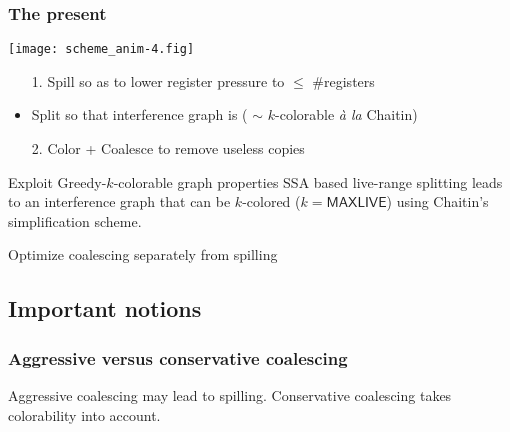\begin{frame}[label=past]
  \frametitle{The present}
\texttt{[image: scheme\_anim-4.fig]}
  \begin{itemize}
  \item[1.] \alert{Spill} so as to lower register pressure to $\leq$ \#registers
  \item \alert{Split} so that interference graph is  
    ( $\sim$ $k$-colorable {\it \`a la} Chaitin)
  \item[2.] \alert{Color + Coalesce} to remove useless copies
  \end{itemize}

\begin{alertblock}{Exploit Greedy-$k$-colorable graph properties}
SSA based live-range splitting leads to an interference graph that can be $k$-colored ($k = \textsf{MAXLIVE}$) using Chaitin's simplification scheme. 
\end{alertblock}

\begin{alertblock}{Optimize coalescing separately from spilling}
\end{alertblock}
\end{frame}



\subsection*{Important notions}


\subsubsection*{Aggressive versus conservative coalescing}
\begin{frame}[label=past]
   \alert<1-3>{Aggressive}
  coalescing may lead to spilling. \alert<4>{Conservative} coalescing
  takes colorability into account.  

\vfill
  \begin{center}\end{center}
\end{frame}

